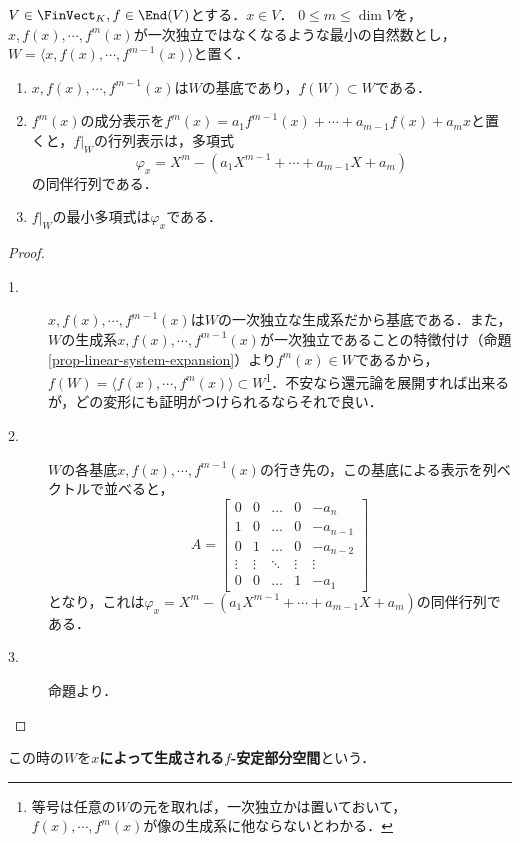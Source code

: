 \documentclass[uplatex, dvipdfmx]{jsreport}
\begin{document}
\begin{proposition}[安定部分空間]\label{prop-stable-subspace}
    $V\in\FinVect_K,f\in\End(V)$とする．$x\in V$．
    $0\le m\le\dim V$を，$x,f(x),\cdots,f^m(x)$が一次独立ではなくなるような最小の自然数とし，$W=\langle x,f(x),\cdots,f^{m-1}(x)\rangle$と置く．
    \begin{enumerate}
        \item $x,f(x),\cdots,f^{m-1}(x)$は$W$の基底であり，$f(W)\subset W$である．
        \item $f^m(x)$の成分表示を$f^m(x)=a_1f^{m-1}(x)+\cdots+a_{m-1}f(x)+a_mx$と置くと，$f|_W$の行列表示は，多項式
        \[ \varphi_x=X^m-(a_1X^{m-1}+\cdots+a_{m-1}X+a_m) \]
        の同伴行列である．
        \item $f|_W$の最小多項式は$\varphi_x$である．
    \end{enumerate}
\end{proposition}
\begin{proof}\mbox{}
    \begin{description}
        \item[1.] $x,f(x),\cdots,f^{m-1}(x)$は$W$の一次独立な生成系だから基底である．また，$W$の生成系$x,f(x),\cdots,f^{m-1}(x)$が一次独立であることの特徴付け（命題\ref{prop-linear-system-expansion}）より$f^m(x)\in W$であるから，$f(W)=\langle f(x),\cdots,f^m(x)\rangle\subset W$\footnote{等号は任意の$W$の元を取れば，一次独立かは置いておいて，$f(x),\cdots,f^m(x)$が像の生成系に他ならないとわかる．}．不安なら還元論を展開すれば出来るが，どの変形にも証明がつけられるならそれで良い．
        \item[2.] $W$の各基底$x,f(x),\cdots,f^{m-1}(x)$の行き先の，この基底による表示を列ベクトルで並べると，
        \[A=\begin{bmatrix}
            0 & 0 & \dots & 0 & -a_n \\
            1 & 0 & \dots & 0 & -a_{n-1} \\
            0 & 1 & \dots & 0 & -a_{n-2} \\
            \vdots & \vdots & \ddots & \vdots & \vdots \\
            0 & 0 & \dots & 1 & -a_1
            \end{bmatrix}\]
        となり，これは$\varphi_x=X^m-(a_1X^{m-1}+\cdots+a_{m-1}X+a_m)$の同伴行列である．
        \item[3.] 命題より．
    \end{description}
\end{proof}

\begin{definition}
    この時の$W$を\textbf{$x$によって生成される$f$-安定部分空間}という．
\end{definition}
\end{document}
